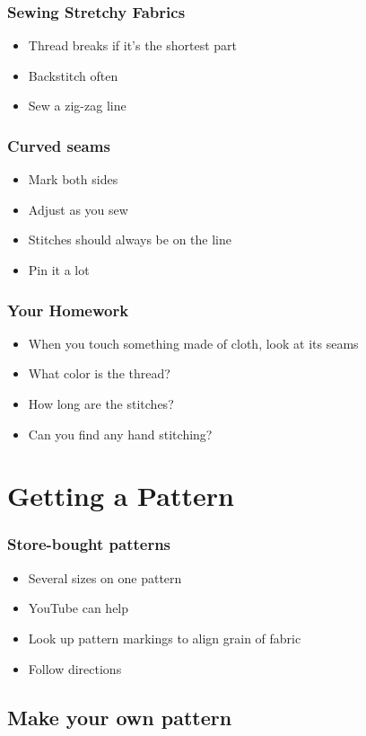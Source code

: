 \documentclass{beamer}
\begin{document}
\begin{frame}[fragile]
\frametitle{Sewing Stretchy Fabrics}
\begin{itemize}[<+(1)->]
\item Thread breaks if it's the shortest part
\item Backstitch often
\item Sew a zig-zag line
\end{itemize}
\end{frame}

\begin{frame}[fragile]
\frametitle{Curved seams}
\begin{itemize}[<+(1)->]
\item Mark both sides
\item Adjust as you sew
\item Stitches should always be on the line
\item Pin it a lot
\end{itemize}
\end{frame}

\begin{frame}[fragile]
\frametitle{Your Homework}
\begin{itemize}[<+(1)->]
\item When you touch something made of cloth, look at its seams
\item What color is the thread?
\item How long are the stitches?
\item Can you find any hand stitching?
\end{itemize}
\end{frame}

\section{Getting a Pattern}

\begin{frame}[fragile]
\frametitle{Store-bought patterns}
\begin{itemize}[<+(1)->]
\item Several sizes on one pattern
\item YouTube can help
\item Look up pattern markings to align grain of fabric
\item Follow directions
\end{itemize}
\end{frame}

\subsection{Make your own pattern}
\end{document}
